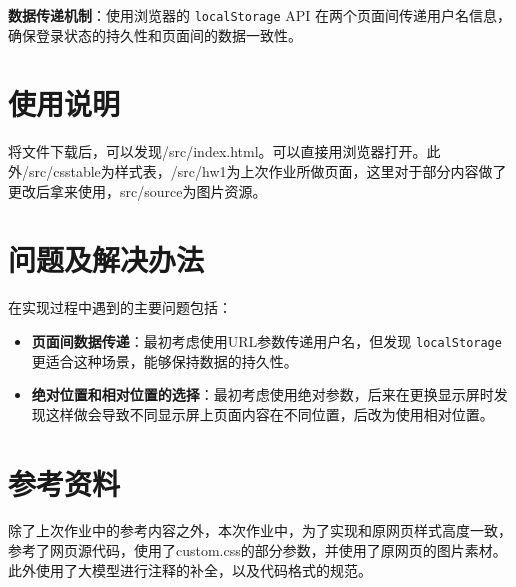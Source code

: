 \documentclass[UTF8]{ctexart}
\begin{document}
\textbf{数据传递机制}：使用浏览器的 \texttt{localStorage} API 在两个页面间传递用户名信息，确保登录状态的持久性和页面间的数据一致性。

\section{使用说明}

将文件下载后，可以发现/src/index.html。可以直接用浏览器打开。此外/src/csstable为样式表，/src/hw1为上次作业所做页面，这里对于部分内容做了更改后拿来使用，src/source为图片资源。

\section{问题及解决办法}

在实现过程中遇到的主要问题包括：

\begin{itemize}
    \item \textbf{页面间数据传递}：最初考虑使用URL参数传递用户名，但发现 \texttt{localStorage} 更适合这种场景，能够保持数据的持久性。
    
    \item \textbf{绝对位置和相对位置的选择}：最初考虑使用绝对参数，后来在更换显示屏时发现这样做会导致不同显示屏上页面内容在不同位置，后改为使用相对位置。
\end{itemize}



\section{参考资料}

除了上次作业中的参考内容之外，本次作业中，为了实现和原网页样式高度一致，参考了网页源代码，使用了custom.css的部分参数，并使用了原网页的图片素材。
此外使用了大模型进行注释的补全，以及代码格式的规范。
\end{document}
